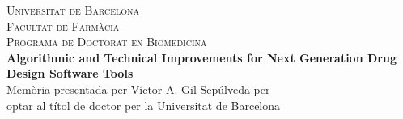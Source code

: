 
\newcommand{\HRule}{\rule{\linewidth}{0.5mm}} %

\center %
 

\textsc{\LARGE Universitat de Barcelona}\\[1.5cm] %
\textsc{\Large Facultat de Farm\`acia}\\[0.5cm] %
\textsc{\large Programa de Doctorat en Biomedicina}\\[0.5cm] %

\vspace{2.5cm}
{ 
\huge \bfseries Algorithmic and Technical Improvements
for Next Generation Drug Design Software
Tools
}\\[0.4cm] %
 
Mem\`oria presentada per  V\'ictor A. Gil Sep\'ulveda per \\
optar al t\'itol de doctor per la Universitat de Barcelona
 
\vspace{5.5cm}


